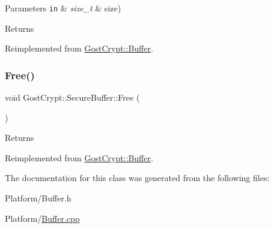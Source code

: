 \begin{DoxyParams}[1]{Parameters}
\mbox{\tt in}  & {\em size\+\_\+t} & size) \\
\hline
\end{DoxyParams}
\begin{DoxyReturn}{Returns}

\end{DoxyReturn}


Reimplemented from \hyperlink{class_gost_crypt_1_1_buffer_aa1416f36bf2d162cd6415989ca1a66d0}{Gost\+Crypt\+::\+Buffer}.

\mbox{\label{class_gost_crypt_1_1_secure_buffer_abaf33112f3fc29a54177f2f32e0148e8}} 
\subsubsection{\texorpdfstring{Free()}{Free()}}
{\footnotesize\ttfamily void Gost\+Crypt\+::\+Secure\+Buffer\+::\+Free (\begin{DoxyParamCaption}{ }\end{DoxyParamCaption})\hspace{0.3cm}{\ttfamily [virtual]}}

\begin{DoxyReturn}{Returns}

\end{DoxyReturn}


Reimplemented from \hyperlink{class_gost_crypt_1_1_buffer_a80b126ff56504ad1d719dcad08c91e03}{Gost\+Crypt\+::\+Buffer}.



The documentation for this class was generated from the following files\+:\begin{DoxyCompactItemize}
\item 
Platform/Buffer.\+h\item 
Platform/\hyperlink{_buffer_8cpp}{Buffer.\+cpp}\end{DoxyCompactItemize}
